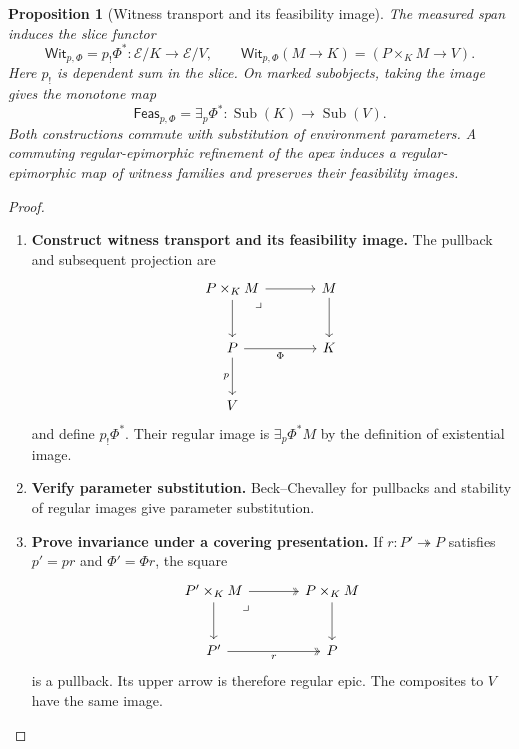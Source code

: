 \documentclass[11pt,a4paper]{article}
\numberwithin{algorithm}{section}
\numberwithin{equation}{section}
\newtheorem{proposition}[proposition]{Proposition}
\theoremstyle{definition}
\theoremstyle{remark}
\theoremstyle{plain}
\newcommand{\E}{\mathcal E}
\newcommand{\onto}{\twoheadrightarrow}
\newcommand{\Sub}{\operatorname{Sub}}
\newcommand{\Wit}{\mathsf{Wit}}
\newcommand{\Feas}{\mathsf{Feas}}
\theoremstyle{definition}
\theoremstyle{plain}
\begin{document}
\begin{proposition}[Witness transport and its feasibility image]
\label{prop:cat-witness-transport}
The measured span induces the slice functor
\[
 \Wit_{p,\Phi}=p_!\Phi^*:\E/K\longrightarrow\E/V,\qquad
 \Wit_{p,\Phi}(M\to K)=(P\times_KM\to V).
\]
Here $p_!$ is dependent sum in the slice.  On marked subobjects,
taking the image gives the monotone map
\[
 \Feas_{p,\Phi}=\exists_p\Phi^*:
       \Sub(K)\longrightarrow\Sub(V).
\]
Both constructions commute with substitution of environment parameters.
A commuting regular-epimorphic refinement of the apex induces a
regular-epimorphic map of witness families and preserves their
feasibility images.
\end{proposition}
\begin{proof}\leavevmode
\begin{enumerate}[leftmargin=*,align=left]
\item \textbf{Construct witness transport and its feasibility image.}
The pullback and subsequent projection are
\begin{equation}\label{eq:cat-witness-pullback}
\begin{tikzcd}[column sep=large,row sep=large]
 P\times_KM \arrow[dr,phantom,"\lrcorner",very near start] \arrow[r] \arrow[d]
   & M \arrow[d]\\
 P \arrow[r,"{\Phi}"'] \arrow[d,"{p}"']
   & K\\
 V &
\end{tikzcd}
\end{equation}
and define $p_!\Phi^*$.  Their regular image is
$\exists_p\Phi^*M$ by the definition of existential image.

\item \textbf{Verify parameter substitution.}
Beck--Chevalley for pullbacks and stability of regular images give
parameter substitution.

\item \textbf{Prove invariance under a covering presentation.}
If $r:P'\onto P$ satisfies
$p'=pr$ and $\Phi'=\Phi r$, the square
\[
\begin{tikzcd}[column sep=large,row sep=large]
 P'\times_KM \arrow[dr,phantom,"\lrcorner",very near start] \arrow[r,two heads] \arrow[d]
   & P\times_KM \arrow[d]\\
 P' \arrow[r,two heads,"{r}"'] & P
\end{tikzcd}
\]
is a pullback.  Its upper arrow is therefore regular epic.
The composites to $V$ have the same image.
\end{enumerate}
\end{proof}
\end{document}
